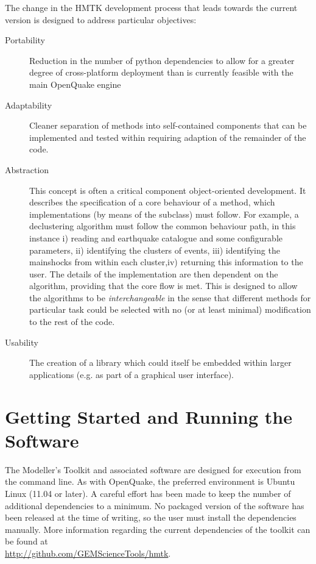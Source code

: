 The change in the HMTK development process that leads towards the current version is designed to address particular objectives:

\begin{description}
\item[Portability] Reduction in the number of python dependencies to allow for a greater degree of cross-platform deployment than is currently feasible with the main OpenQuake engine

\item[Adaptability] Cleaner separation of methods into self-contained components that can be implemented and tested within requiring adaption of the remainder of the code.

\item[Abstraction] This concept is often a critical component object-oriented development. It describes the specification of a core behaviour of a method, which implementations (by means of the subclass) must follow. For example, a declustering algorithm must follow the common behaviour path, in this instance i) reading and earthquake catalogue and some configurable parameters, ii) identifying the clusters of events, iii) identifying the mainshocks from within each cluster,iv) returning this information to the user. The details of the implementation are then dependent on the algorithm, providing that the core flow is met. This is designed to allow the algorithms to be \emph{interchangeable} in the sense that different methods for  particular task could be selected with no (or at least minimal) modification to the rest of the code.

\item[Usability] The creation of a library which could itself be embedded within larger applications (e.g. as part of a graphical user interface).
 
\end{description}



\section{Getting Started and Running the Software}

The Modeller's Toolkit and associated software are designed for execution 
from the command line. As with OpenQuake, the preferred environment is 
Ubuntu Linux (11.04 or later). A careful effort has been made to keep 
the number of additional dependencies to a minimum. No packaged version of the software has been released at the time of writing, so the user must install the dependencies manually. More information regarding the current dependencies of the toolkit can be found at \hfill \\
\href{http://github.com/GEMScienceTools/hmtk}{http://github.com/GEMScienceTools/hmtk}. 

